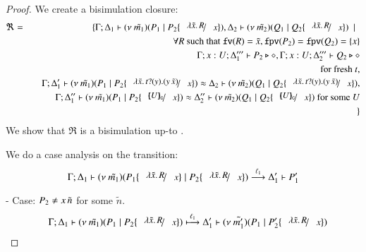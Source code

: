 \begin{proof}
	We create a bisimulation closure:
%
	\begin{eqnarray*}
		\Re &=&
			\set{\horel{\Gamma}{\Delta_1}{\newsp{\tilde{m_1}}{P_1 \Par P_2 \subst{\abs{\tilde{x}}{R}}{x}}}{,}
			{\Delta_2}{\newsp{\tilde{m_2}}{Q_1 \Par Q_2 \subst{\abs{\tilde{x}}{R}}{x}}} \setbar \\
			&& \quad \forall R \textrm{ such that } \fv{R} = \tilde{x}, \fpv{P_2} = \fpv{Q_2} = \set{x}\\
			&& \quad \Gamma; x: U; \Delta_1''' \proves P_2 \hastype \Proc, \Gamma; x: U; \Delta_2''' \proves Q_2 \hastype \Proc\\
			&& \quad \textrm{for fresh } t,\\
			&& \quad \horel{\Gamma}{\Delta_1'}{\newsp{\tilde{m_1}}{P_1 \Par P_2 \subst{\abs{\tilde{x}}{\binp{t}{y} (\appl{y}{\tilde{x}})}}{x}}}{\wb}{\Delta_2}{\newsp{\tilde{m_2}}{Q_1 \Par Q_2 \subst{\abs{\tilde{x}}{\binp{t}{y} (\appl{y}{\tilde{x}})}}{x}}},\\
			&& \quad \horel{\Gamma}{\Delta_1''}{\newsp{\tilde{m_1}}{P_1 \Par P_2 \subst{\omapchar{U}}{x}}}{\wb}{\Delta_2''}{\newsp{\tilde{m_2}}{Q_1 \Par Q_2 \subst{\omapchar{U}}{x}} \textrm{ for some } U}\\
			&&}
	\end{eqnarray*}
%
	\noi  We show that $\Re$ is a bisimulation up-to \betatran.

	\noi We do a case analysis on the transition:
%
	\[
		\horel{\Gamma}{\Delta_1}{\newsp{\tilde{m_1}}{P_1 \subst{\abs{\tilde{x}}{R}}{x} \Par P_2\subst{\abs{\tilde{x}}{R}}{x} }}{\by{\ell_1}}{\Delta_1'}{P_1'}
	\]
%

	\noi - Case: $P_2 \not= x\,\tilde{n}$ for some $\tilde{n}$.
%
	\begin{eqnarray*}
		&&	\horel{\Gamma}{\Delta_1}
			{\newsp{\tilde{m_1}}{P_1 \Par P_2 \subst{\abs{\tilde{x}}{R}}{x} }}
			{\hby{\ell_1}}
			{\Delta_1'}{\newsp{\tilde{m_1'}}{P_1 \Par P_2' \subst{\abs{\tilde{x}}{R}}{x}}}
	\end{eqnarray*}


\end{proof}
